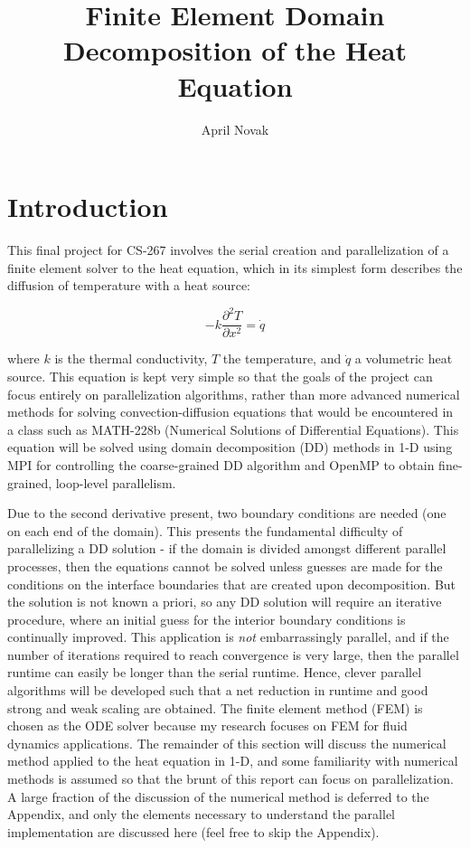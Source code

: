 \documentclass[10pt]{article}
\title{Finite Element Domain Decomposition of the Heat Equation}
\author{April Novak}
\newcommand{\beq}{\begin{equation}}
\newcommand{\eeq}{\end{equation}}
\begin{document}
\maketitle

\section{Introduction}

This final project for CS-267 involves the serial creation and parallelization of a finite element solver to the heat equation, which in its simplest form describes the diffusion of temperature with a heat source:

\beq
\label{eq:eq}
-k\frac{\partial^2 T}{\partial x^2}=\dot{q}
\eeq

where \(k\) is the thermal conductivity, \(T\) the temperature, and \(\dot{q}\) a volumetric heat source. This equation is kept very simple so that the goals of the project can focus entirely on parallelization algorithms, rather than more advanced numerical methods for solving convection-diffusion equations that would be encountered in a class such as MATH-228b (Numerical Solutions of Differential Equations). This equation will be solved using domain decomposition (DD) methods in 1-D using MPI for controlling the coarse-grained DD algorithm and OpenMP to obtain fine-grained, loop-level parallelism.

Due to the second derivative present, two boundary conditions are needed (one on each end of the domain). This presents the fundamental difficulty of parallelizing a DD solution - if the domain is divided amongst different parallel processes, then the equations cannot be solved unless guesses are made for the conditions on the interface boundaries that are created upon decomposition. But the solution is not known a priori, so any DD solution will require an iterative procedure, where an initial guess for the interior boundary conditions is continually improved. This application is \textit{not} embarrassingly parallel, and if the number of iterations required to reach convergence is very large, then the parallel runtime can easily be longer than the serial runtime. Hence, clever parallel algorithms will be developed such that a net reduction in runtime and good strong and weak scaling are obtained. The finite element method (FEM) is chosen as the ODE solver because my research focuses on FEM for fluid dynamics applications. The remainder of this section will discuss the numerical method applied to the heat equation in 1-D, and some familiarity with numerical methods is assumed so that the brunt of this report can focus on parallelization. A large fraction of the discussion of the numerical method is deferred to the Appendix, and only the elements necessary to understand the parallel implementation are discussed here (feel free to skip the Appendix). 
\end{document}
